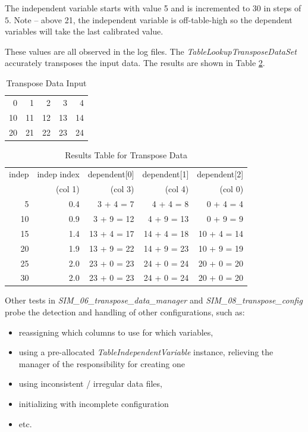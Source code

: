 \documentclass[11pt,fleqn]{report}
\begin{document}
The independent variable starts with value 5 and is incremented to $30$
in steps of $5$.  Note -- above 21, the independent variable is
off-table-high so the dependent variables will take the last calibrated
value.

These values are all observed in the log files.  The
\textit{TableLookupTransposeDataSet} accurately transposes the input data.
The results are shown in Table \ref{tab:td_out}.


\begin{table}
\caption{Transpose Data Input}
\label{tab:td_in}
\begin{center}
\begin{tabular}{|rrrrr|}
\hline
0  &  1 &  2 &  3 &  4\\
10 & 11 & 12 & 13 & 14\\
20 & 21 & 22 & 23 & 24\\
\hline
\end{tabular}
\end{center}
\end{table}

\begin{table}
\caption{Results Table for Transpose Data}
\label{tab:td_out}
\begin{center}
\begin{tabular}{|r|r|r|r|r|} \hline
indep & indep index & dependent[0] & dependent[1] & dependent[2] \\
      & (col 1)     & (col 3)      & (col 4)      & (col 0) \\
\hline\hline
 5    & 0.4          & 3 + 4 = 7   & 4 + 4 = 8    & 0 + 4 = 4 \\ \hline
10    & 0.9          & 3 + 9 = 12  & 4 + 9 = 13   & 0 + 9 = 9 \\ \hline
15    & 1.4          & 13 + 4 = 17 & 14 + 4 = 18  & 10 + 4 = 14 \\ \hline
20    & 1.9          & 13 + 9 = 22 & 14 + 9 = 23  & 10 + 9 = 19 \\ \hline
25    & 2.0          & 23 + 0 = 23 & 24 + 0 = 24  & 20 + 0 = 20 \\ \hline
30    & 2.0          & 23 + 0 = 23 & 24 + 0 = 24  & 20 + 0 = 20 \\ \hline
\end{tabular}
\end{center}
\end{table}

Other tests in \textit{SIM\_06\_transpose\_data\_manager} and
\textit{SIM\_08\_transpose\_config} probe the detection and handling of
other configurations, such as:
\begin{itemize}
  \item reassigning which columns to use for which variables,
  \item using a pre-allocated \textit{TableIndependentVariable} instance,
  relieving the manager of the responsibility for creating one
  \item using inconsistent / irregular data files,
  \item initializing with incomplete configuration
  \item etc.
\end{itemize}
\end{document}
